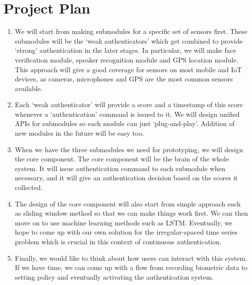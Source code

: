 \documentclass[a4paper, 11pt]{article}
\begin{document}
\section*{Project Plan}
\begin{enumerate}
\item We will start from making submodules for a specific set of sensors first. These submodules will be the ‘weak authenticators’ which get combined to provide ‘strong’ authentication in the later stages. In particular, we will make face verification module, speaker recognition module and GPS location module. This approach will give a good coverage for sensors on most mobile and IoT devices, as cameras, microphones and GPS are the most common sensors available.  
\item Each ‘weak authenticator’ will provide a score and a timestamp of this score whenever a ‘authentication’ command is issued to it. We will design unified APIs for submodules so each module can just ‘plug-and-play’. Addition of new modules in the future will be easy too.
\item When we have the three submodules we need for prototyping, we will design the core component. The core component will be the brain of the whole system. It will issue authentication command to each submodule when necessary, and it will give an authentication decision based on the scores it collected.
\item The design of the core component will also start from simple approach such as sliding window method so that we can make things work first. We can then move on to use machine learning methods such as LSTM. Eventually, we hope to come up with our own solution for the irregular-spaced time series problem which is crucial in this context of continuous authentication.
\item Finally, we would like to think about how users can interact with this system. If we have time, we can come up with a flow from recording biometric data to setting policy and eventually activating the authentication system.
\end{enumerate}
\end{document}
